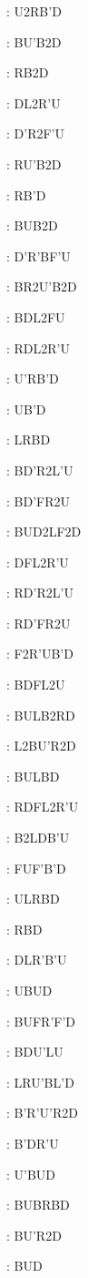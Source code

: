 \documentclass[9pt]{article}
\begin{document}
{\begin{multicols}{6}
: U2RB'D

: BU'B2D

: RB2D

: DL2R'U

: D'R2F'U

: RU'B2D

: RB'D

: BUB2D

: D'R'BF'U

: BR2U'B2D

: BDL2FU

: RDL2R'U

: U'RB'D

: UB'D

: LRBD

: BD'R2L'U

: BD'FR2U

: BUD2LF2D

: DFL2R'U

: RD'R2L'U

: RD'FR2U

: F2R'UB'D

: BDFL2U

: BULB2RD

: L2BU'R2D

: BULBD

: RDFL2R'U

: B2LDB'U

: FUF'B'D

: ULRBD

: RBD

: DLR'B'U

: UBUD

: BUFR'F'D

: BDU'LU

: LRU'BL'D

: B'R'U'R2D

: B'DR'U

: U'BUD

: BUBRBD

: BU'R2D

: BUD


\end{multicols}}
\end{document}
